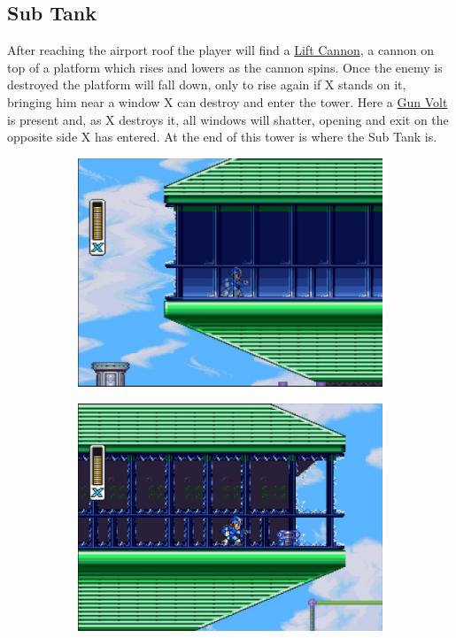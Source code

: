\subsection{Sub Tank}
After reaching the airport roof the player will find a 	\hyperlink{enem:Lift_Cannon}{Lift Cannon}, a cannon on top of a platform which rises and lowers as the cannon spins. Once the enemy is destroyed the platform will fall down, only to rise again if X stands on it, bringing him near a window X can destroy and enter the tower. Here a \hyperlink{enem:Gun_Volt}{Gun Volt} is present and, as X destroys it, all windows will shatter, opening and exit on the opposite side X has entered. At the end of this tower is where the Sub Tank is. 
 
 \begin{figure}[htp]
 	\centering
 	\begin{subfigure}{0.4\linewidth}
 		\centering
 		\includegraphics[width=\linewidth]{figures/X1/Storm_eagle/Storm_tank_1.jpg}
 		\caption{}
 	\end{subfigure}
 	\begin{subfigure}{0.4\linewidth}
 		\centering
 		\includegraphics[width=\linewidth]{figures/X1/Storm_eagle/Storm_tank_2.jpg}

\end{subfigure}
\end{figure}
